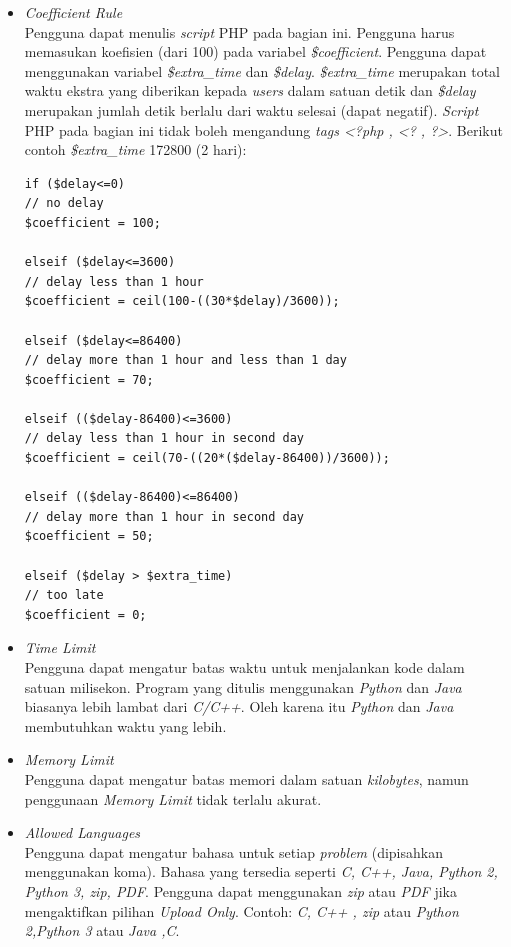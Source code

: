 \documentclass[a4paper,twoside]{article}
\begin{document}
\begin{enumerate}
\begin{itemize}
			\item \textit{Coefficient Rule} \\
			Pengguna dapat menulis \textit{script} PHP pada bagian ini. Pengguna harus memasukan koefisien (dari 100) pada variabel \textit{\$coefficient}. Pengguna dapat menggunakan variabel \textit{\$extra\_time} dan \textit{\$delay}. \textit{\$extra\_time} merupakan total waktu ekstra yang diberikan kepada \textit{users} dalam satuan detik dan \textit{\$delay} merupakan jumlah detik berlalu dari waktu selesai (dapat negatif). \textit{Script} PHP pada bagian ini tidak boleh mengandung \textit{tags <?php , <? , ?>}. Berikut contoh \textit{\$extra\_time} 172800 (2 hari):
			
			\begin{lstlisting}[basicstyle=\ttfamily, frame=single,
			columns=fullflexible, keepspaces=true, breaklines=true, label=ls:7]
if ($delay<=0)
// no delay
$coefficient = 100;

elseif ($delay<=3600)
// delay less than 1 hour
$coefficient = ceil(100-((30*$delay)/3600));

elseif ($delay<=86400)
// delay more than 1 hour and less than 1 day
$coefficient = 70;

elseif (($delay-86400)<=3600)
// delay less than 1 hour in second day
$coefficient = ceil(70-((20*($delay-86400))/3600));

elseif (($delay-86400)<=86400)
// delay more than 1 hour in second day
$coefficient = 50;

elseif ($delay > $extra_time)
// too late
$coefficient = 0;
			\end{lstlisting}
			
			\item \textit{Time Limit} \\
			Pengguna dapat mengatur batas waktu untuk menjalankan kode dalam satuan milisekon. Program yang ditulis menggunakan \textit{Python} dan \textit{Java} biasanya lebih lambat dari \textit{C/C++}. Oleh karena itu \textit{Python} dan \textit{Java} membutuhkan waktu yang lebih.
			
			\item \textit{Memory Limit} \\
			Pengguna dapat mengatur batas memori dalam satuan \textit{kilobytes}, namun penggunaan \textit{Memory Limit} tidak terlalu akurat.
			
			\item \textit{Allowed Languages} \\
			Pengguna dapat mengatur bahasa untuk setiap \textit{problem} (dipisahkan menggunakan koma). Bahasa yang tersedia seperti \textit{C, C++, Java, Python 2, Python 3, zip, PDF}. Pengguna dapat menggunakan \textit{zip} atau \textit{PDF} jika mengaktifkan pilihan \textit{Upload Only}. Contoh: \textit{C, C++ , zip} atau \textit{Python 2,Python 3} atau \textit{Java ,C}.
			

\end{itemize}
\end{enumerate}
\end{document}
